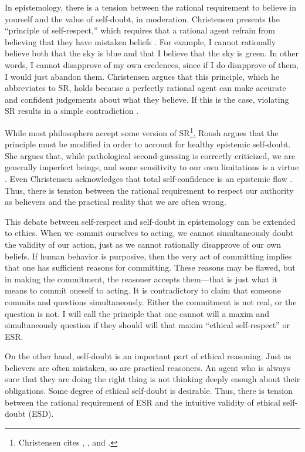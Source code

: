 \begin{isabellebody}
\begin{isamarkuptext}
In epistemology, there is a tension between the rational requirement to believe in yourself and the 
value of self-doubt, in moderation. Christensen presents the ``principle of self-respect,'' which requires 
that a rational agent refrain from believing that they have mistaken beliefs \cite[4]{christensen}. For example, I cannot 
rationally believe both that the sky is blue and that I believe that the sky is green. In other words, I cannot 
disapprove of my own credences, since if I do disapprove of them, I would just abandon them. Christensen 
argues that this principle, which he abbreviates to SR, holds because 
a perfectly rational agent can make accurate and confident judgements about what they believe. If this 
is the case, violating SR results in a simple contradiction \cite[8-9]{christensen}. 

While most philosophers accept some version of SR\footnote{Christensen cites \citet{vanfraassen}, 
\citet{vickers}, and \citet{koons}.}, 
Roush argues that the principle must be modified in order to account for healthy epistemic 
self-doubt. She argues that, while pathological second-guessing is correctly criticized, we are generally 
imperfect beings, and some sensitivity to our own limitations is a virtue \cite[2]{roushselfhelp}. Even Christensen 
acknowledges that total self-confidence is an epistemic flaw \cite[1]{christensen}. Thus, there is tension between the rational
requirement to respect our authority as believers and the practical reality that we are often wrong. 

This debate between self-respect and self-doubt in epistemology can be extended to ethics. When we 
commit ourselves to acting, we cannot simultaneously doubt the validity of our action, just as we cannot
rationally disapprove of our own beliefs. If human 
behavior is purposive, then the very act of committing implies that one has sufficient reasons for 
committing. These reasons may be flawed, but in making the commitment, the reasoner accepts them—that is 
just what it means to commit oneself to acting. It 
is contradictory to claim that someone commits and questions simultaneously. Either the commitment 
is not real, or the question is not. I will call the principle that one cannot will a maxim and 
simultaneously question if they should will that maxim ``ethical self-respect'' or ESR.

On the other hand, self-doubt is an important part of ethical reasoning. Just as believers are often 
mistaken, so are practical reasoners. An agent who is always sure that they are doing the right thing 
is not thinking deeply enough about their obligations. Some degree of ethical self-doubt is desirable. 
Thus, there is tension between the rational requirement of ESR and the intuitive validity of ethical 
self-doubt (ESD).


\end{isamarkuptext}
\end{isabellebody}

